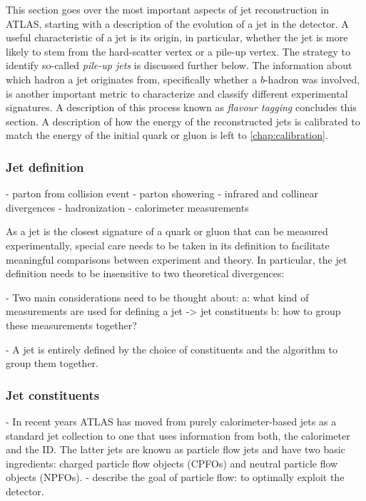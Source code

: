 This section goes over the most important aspects of jet reconstruction in ATLAS, starting with a description of the evolution of a jet in the detector. 
A useful characteristic of a jet is its origin, in particular, whether the jet is more likely to stem from the hard-scatter vertex or a pile-up vertex. The strategy to identify so-called \emph{pile-up jets} is discussed further below.
The information about which hadron a jet originates from, specifically whether a $b$-hadron was involved, is another important metric to characterize and classify different experimental signatures. A description of this process known as \emph{flavour tagging} concludes this section.
A description of how the energy of the reconstructed jets is calibrated to match the energy of the initial quark or gluon is left to \cref{chap:calibration}. 

\subsubsection{Jet definition}
- parton from collision event
- parton showering
    - infrared and collinear divergences
- hadronization
- calorimeter measurements

As a jet is the closest signature of a quark or gluon that can be measured experimentally, special care needs to be taken in its definition to facilitate meaningful comparisons between experiment and theory.
In particular, the jet definition needs to be insensitive to two theoretical divergences:

- Two main considerations need to be thought about:
    a: what kind of measurements are used for defining a jet -> jet constituents
    b: how to group these measurements together? 

- A jet is entirely defined by the choice of constituents and the algorithm to group them together.


\subsubsection{Jet constituents}
- In recent years ATLAS has moved from purely calorimeter-based jets as a standard jet collection to one that uses information from both, the calorimeter and the ID. The latter jets are known as particle flow jets and have two basic ingredients: charged particle flow objects (CPFOs) and neutral particle flow objects (NPFOs). 
- describe the goal of particle flow: to optimally exploit the detector. 

